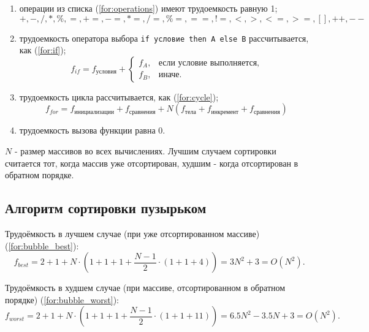 \documentclass[a4paper,14pt, unknownkeysallowed]{extreport}
\newcommand{\code}[1]{\texttt{#1}}
\begin{document}
\begin{enumerate}
	\item операции из списка (\ref{for:operations}) имеют трудоемкость равную 1;
	\begin{equation}
		\label{for:operations}
		+, -, /, *, \%, =, +=, -=, *=, /=, \%=, ==, !=, <, >, <=, >=, [], ++, {-}-
	\end{equation}
	\item трудоемкость оператора выбора \code{if условие then A else B} рассчитывается, как (\ref{for:if});
	\begin{equation}
		\label{for:if}
		f_{if} = f_{\text{условия}} +
		\begin{cases}
			f_A, & \text{если условие выполняется,}\\
			f_B, & \text{иначе.}
		\end{cases}
	\end{equation}
	\item трудоемкость цикла рассчитывается, как (\ref{for:cycle});
	\begin{equation}
		\label{for:cycle}
		f_{for} = f_{\text{инициализации}} + f_{\text{сравнения}} + N(f_{\text{тела}} + f_{\text{инкремент}} + f_{\text{сравнения}})
	\end{equation}
	\item трудоемкость вызова функции равна 0.
\end{enumerate}


$N$ - размер массивов во всех вычислениях. Лучшим случаем сортировки считается тот, когда массив уже отсортирован, худшим - когда отсортирован в обратном порядке.

\subsection{Алгоритм сортировки пузырьком}

Трудоёмкость в лучшем случае (при уже отсортированном массиве) (\ref{for:bubble_best}):
\begin{equation}
	\label{for:bubble_best}
    f_{best} = 2 + 1 + N \cdot (1 + 1 + 1 + \frac{N - 1}{2} \cdot (1 + 1 + 4)) = 3N^2 + 3 = O(N^2).
\end{equation}

Трудоёмкость в худшем случае (при массиве, отсортированном в обратном порядке) (\ref{for:bubble_worst}):
\begin{equation}
	\label{for:bubble_worst}
    f_{worst} = 2 + 1 + N \cdot (1 + 1 + 1 + \frac{N - 1}{2} \cdot (1 + 1 + 11)) = 6.5N^2 - 3.5N + 3 = O(N^2).
\end{equation}
\end{document}
